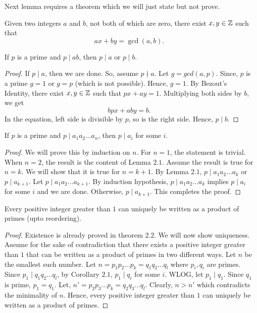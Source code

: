 Next lemma requires a theorem which we will just state but not prove.
\begin{theorem}
    Given two integers $a$ and $b$, not both of which are zero, there exist $x,y\in\mathbb{Z}$ such that \[ax+by=\gcd(a,b).\]
\end{theorem}
\begin{lemma}
    If $p$ is a prime and $p \mid ab$, then $p \mid a$ or $p \mid b$.
\end{lemma}
\begin{proof}
    If $p \mid a$, then we are done. So, assume $p \nmid a$. Let $g = gcd(a, p).$ Since, $p$ is a prime $g = 1$ or $g = p$ (which is not possible). Hence, $g = 1$. By Bezout's Identity, there exist $x,y\in\mathbb{Z}$ such that $px + ay = 1.$ Multiplying both sides by $b$, we get \[bpx + aby = b.\] In the equation, left side is divisible by $p$, so is the right side. Hence, $p \mid b$.
\end{proof}
\begin{corollary}
    If $p$ is a prime and $p \mid a_1a_2\dots a_n$, then $p \mid a_i$ for some $i$.
\end{corollary}
\begin{proof}
    We will prove this by induction on $n$. For $n=1$, the statement is trivial. When $n = 2$, the result is the content of Lemma $2.1$. Assume the result is true for $n = k$. We will show that it is true for $n = k+1$. By Lemma $2.1$, $p \mid a_1a_2\dots a_k$ or $p \mid a_{k+1}$. Let $p \mid a_1a_2\dots a_{k+1}$. By induction hypothesis, $p \mid a_1a_2\dots a_k$ implies $p \mid a_i$ for some $i$ and we are done. Otherwise, $p \mid a_{k+1}$. This completes the proof.
\end{proof}
\begin{theorem}
    Every positive integer greater than $1$ can uniquely be written as a product of primes (upto reordering).
\end{theorem}
\begin{proof}
    Existence is already proved in theorem $2.2$. We will now show uniqueness. Assume for the sake of contradiction that there exists a positive integer greater than $1$ that can be written as a product of primes in two different ways. Let $n$ be the smallest such number. Let $n = p_1p_2\dots p_k = q_1q_2\dots q_l$ where $p_i, q_i$ are primes. Since $p_1 \mid q_1q_2\dots q_l$, by Corollary $2.1$, $p_1 \mid q_i$ for some $i$. WLOG, let $p_1 \mid q_1$. Since $q_1$ is prime, $p_1 = q_1$. Let, $n' = p_2p_3\dots p_k = q_2q_3\dots q_l$. Clearly, $n > n'$ which contradicts the minimality of $n$. Hence, every positive integer greater than $1$ can uniquely be written as a product of primes.
\end{proof}
